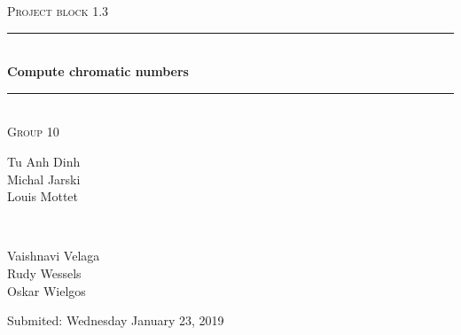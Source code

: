 \documentclass[a4paper]{report}
\begin{document}
	\begin{titlepage} 
		\newcommand{\HRule}{\rule{\linewidth}{0.5mm}}
		
		\center 
		
		\textsc{\large Project block 1.3}\\[0.5cm] 
		
		\HRule\\[0.4cm]
		
		{\huge\bfseries Compute chromatic numbers}\\[0.4cm] 
		
		\HRule\\[1.5cm]
		
		\textsc{\large Group 10}\\[0.5cm]

		\begin{minipage}{0.6\textwidth}
			\begin{flushleft}
				Tu Anh Dinh\\Michal Jarski\\Louis Mottet
			\end{flushleft}
		\end{minipage}
		~
		\begin{minipage}{0.3\textwidth}
			\begin{flushleft}
				Vaishnavi Velaga\\Rudy Wessels\\Oskar Wielgos
			\end{flushleft}
		\end{minipage}
		
		\vspace{2cm}
		
		Submited: Wednesday January 23, 2019
		
		
	\end{titlepage}
	
	
	
	
	
\end{document}
